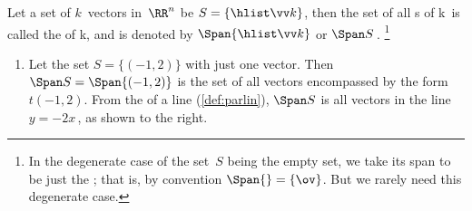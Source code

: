 \begin{definition} \label{def:span} 
Let a set of \(k\)~vectors in~\(\RR^n\) be  \(S=\{\hlist\vv k\}\), then the set of all s of \hlist\vv k\ is called the  of \hlist\vv k, and is denoted by \(\Span\{\hlist\vv k\}\) or \(\Span S\)\,.%
\footnote{In the degenerate case of the set~\(S\) being the empty set, we take its span to be just the ; that is, by convention \(\Span\{\}=\{\ov\}\).  But we rarely need this degenerate case.}
\end{definition}

\begin{example} \label{eg:span}
\begin{enumerate}
\item 
\begin{figbox}{}%
Let the set \(S=\{(-1,2)\}\) with just one vector.  
Then \(\Span S=\Span\{(-1,2)\}\) is the set of all vectors encompassed by the form \(t(-1,2)\).
From the  of a line (\cref{def:parlin}), \(\Span S\) is all vectors in the line \(y=-2x\)\,, as shown to the right.
\vspace{1\baselineskip}
\end{figbox}



\end{enumerate}
\end{example}
